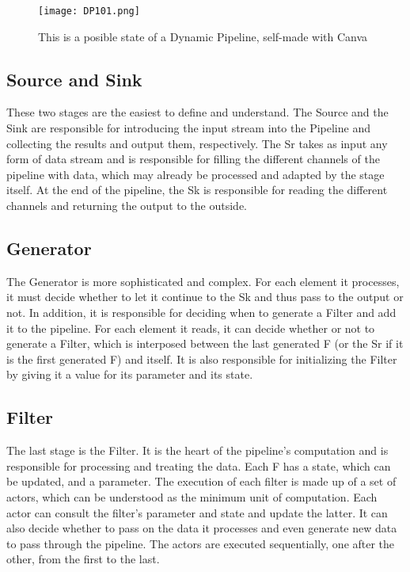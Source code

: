 \begin{figure}[H]
    \centering
    \texttt{[image: DP101.png]}
    \caption[{[Lib]} Posible structure of a DP]{This is a posible state of a Dynamic Pipeline, self-made with Canva}
    \label{fig:DP101}
\end{figure}

\subsection*{Source and Sink}
These two stages are the easiest to define and understand.
The Source and the Sink are responsible for introducing the input stream into the Pipeline and collecting the results and output them, respectively.
The Sr takes as input any form of data stream and is responsible for filling the different channels of the pipeline with data, which may already be processed and adapted by the stage itself.
At the end of the pipeline, the Sk is responsible for reading the different channels and returning the output to the outside.

\subsection*{Generator}
The Generator is more sophisticated and complex.
For each element it processes, it must decide whether to let it continue to the Sk and thus pass to the output or not.
In addition, it is responsible for deciding when to generate a Filter and add it to the pipeline.
For each element it reads, it can decide whether or not to generate a Filter, which is interposed between the last generated F (or the Sr if it is the first generated F) and itself.
It is also responsible for initializing the Filter by giving it a value for its parameter and its state.

\subsection*{Filter}
The last stage is the Filter.
It is the heart of the pipeline's computation and is responsible for processing and treating the data.
Each F has a state, which can be updated, and a parameter.
The execution of each filter is made up of a set of actors, which can be understood as the minimum unit of computation.
Each actor can consult the filter's parameter and state and update the latter.
It can also decide whether to pass on the data it processes and even generate new data to pass through the pipeline.
The actors are executed sequentially, one after the other, from the first to the last.

